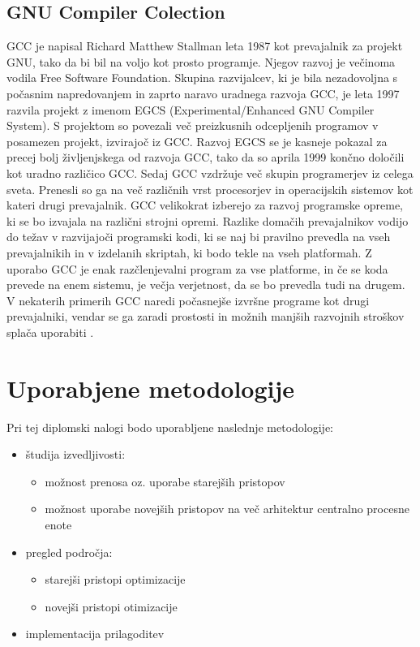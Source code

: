 \documentclass[a4paper, 12pt]{book}
\begin{document}
\subsection{GNU Compiler Colection}
GCC je napisal Richard Matthew Stallman leta 1987 kot prevajalnik za projekt GNU, tako da bi bil na voljo kot prosto programje. Njegov razvoj je večinoma vodila Free Software Foundation. Skupina razvijalcev, ki je bila nezadovoljna s počasnim napredovanjem in zaprto naravo uradnega razvoja GCC, je leta 1997 razvila projekt z imenom EGCS (Experimental/Enhanced GNU Compiler System). S projektom so povezali več preizkusnih odcepljenih programov v posamezen projekt, izvirajoč iz GCC. Razvoj EGCS se je kasneje pokazal za precej bolj življenjskega od razvoja GCC, tako da so aprila 1999 končno določili kot uradno različico GCC. Sedaj GCC vzdržuje več skupin programerjev iz celega sveta. Prenesli so ga na več različnih vrst procesorjev in operacijskih sistemov kot kateri drugi prevajalnik. GCC velikokrat izberejo za razvoj programske opreme, ki se bo izvajala na različni strojni opremi. Razlike domačih prevajalnikov vodijo do težav v razvijajoči programski kodi, ki se naj bi pravilno prevedla na vseh prevajalnikih in v izdelanih skriptah, ki bodo tekle na vseh platformah. Z uporabo GCC je enak razčlenjevalni program za vse platforme, in če se koda prevede na enem sistemu, je večja verjetnost, da se bo prevedla tudi na drugem. V nekaterih primerih GCC naredi počasnejše izvršne programe kot drugi prevajalniki, vendar se ga zaradi prostosti in možnih manjših razvojnih stroškov splača uporabiti \cite{gcc2}.
\section{Uporabjene metodologije}
Pri tej diplomski nalogi bodo uporabljene naslednje metodologije:
\begin{itemize}
\item \v{s}tudija izvedljivosti:
\begin{itemize}
	\item mo\v{z}nost prenosa oz. uporabe starej\v{s}ih pristopov
	\item mo\v{z}nost uporabe novej\v{s}ih pristopov na ve\v{c} arhitektur centralno procesne enote
\end{itemize}
\item pregled podro\v cja:
\begin{itemize}
	\item starej\v{s}i pristopi optimizacije
	\item novej\v{s}i pristopi otimizacije
\end{itemize}
\item implementacija prilagoditev
\end{itemize} 
\end{document}
